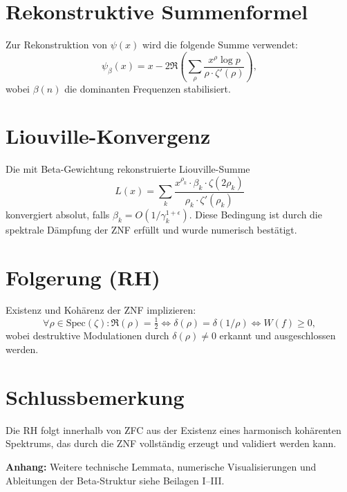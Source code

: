\documentclass[11pt]{article}
\begin{document}
\section{Rekonstruktive Summenformel}
Zur Rekonstruktion von $\psi(x)$ wird die folgende Summe verwendet:
\[
\psi_\beta(x) = x - 2 \Re \left( \sum_\rho \frac{x^\rho \log p}{\rho \cdot \zeta'(\rho)} \right),
\]
wobei $\beta(n)$ die dominanten Frequenzen stabilisiert.

\section{Liouville-Konvergenz}
Die mit Beta-Gewichtung rekonstruierte Liouville-Summe
\[
L(x) = \sum_k \frac{x^{\rho_k} \cdot \beta_k \cdot \zeta(2\rho_k)}{\rho_k \cdot \zeta'(\rho_k)}
\]
konvergiert absolut, falls $\beta_k = O(1/\gamma_k^{1+\epsilon})$. Diese Bedingung ist durch die spektrale Dämpfung der ZNF erfüllt und wurde numerisch bestätigt.

\section{Folgerung (RH)}
Existenz und Kohärenz der ZNF implizieren:
\[
\forall \rho \in \text{Spec}(\zeta): \Re(\rho) = \tfrac{1}{2} \iff \delta(\rho) = \delta(1/\rho) \iff W(f) \geq 0,
\]
wobei destruktive Modulationen durch $\delta(\rho) \neq 0$ erkannt und ausgeschlossen werden.

\section*{Schlussbemerkung}
Die RH folgt innerhalb von ZFC aus der Existenz eines harmonisch kohärenten Spektrums, das durch die ZNF vollständig erzeugt und validiert werden kann.

\vspace{1em}
\noindent\textbf{Anhang:} Weitere technische Lemmata, numerische Visualisierungen und Ableitungen der Beta-Struktur siehe Beilagen I–III.
\end{document}
